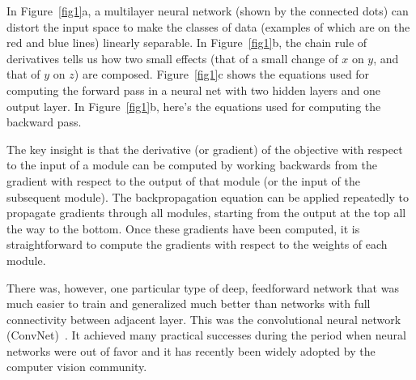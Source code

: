 \documentclass[10pt,twocolumn,letterpaper]{article}
\begin{document}
	In Figure~\ref{fig1}a, a multilayer neural network (shown by the connected dots) can distort the input space to make the classes of data (examples of which are on the red and blue lines) linearly separable. In Figure~\ref{fig1}b, the chain rule of derivatives tells us how two small effects (that of a small change of $x$ on $y$, and that of $y$ on $z$) are composed. Figure~\ref{fig1}c shows the equations used for computing the forward pass in a neural net with two hidden layers and one output layer. In Figure~\ref{fig1}b, here's the equations used for computing the backward pass.
	\par
	The key insight is that the derivative (or gradient) of the objective with respect to the input of a module can be computed by working backwards from the gradient with respect to the output of that module (or the input of the subsequent module). The backpropagation equation can be applied repeatedly to propagate gradients through all modules, starting from the output at the top all the way to the bottom. Once these gradients have been computed, it is straightforward to compute the gradients with respect to the weights of each module.
	\par
	There was, however, one particular type of deep, feedforward network that was much easier to train and generalized much better than networks with full connectivity between adjacent layer. This was the convolutional neural network (ConvNet)~\cite{Cun1990Handwritten}. It achieved many practical successes during the period when neural networks were out of favor and it has recently been widely adopted by the computer vision community.
	{\small
		
		
	}
\end{document}
